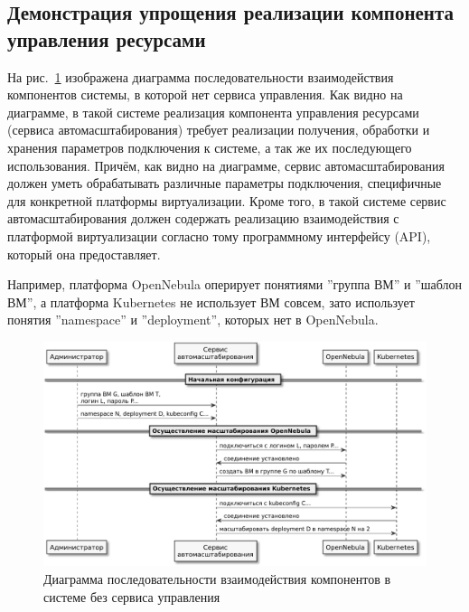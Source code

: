 \subsection[Демонстрация упрощения реализации компонента управления ресурсами]{Демонстрация упрощения реализации компонента \\ управления ресурсами}

На рис.~\ref{result-before} изображена диаграмма последовательности взаимодействия компонентов системы, в которой нет сервиса управления.
Как видно на диаграмме, в такой системе реализация компонента управления ресурсами (сервиса автомасштабирования) требует реализации получения, обработки и хранения параметров подключения к системе, а так же их последующего использования.
Причём, как видно на диаграмме, сервис автомасштабирования должен уметь обрабатывать различные параметры подключения, специфичные для конкретной платформы виртуализации.
Кроме того, в такой системе сервис автомасштабирования должен содержать реализацию взаимодействия с платформой виртуализации согласно тому программному интерфейсу (API), который она предоставляет.

Например, платформа OpenNebula оперирует понятиями ''группа ВМ'' и ''шаблон ВМ'', а платформа Kubernetes не использует ВМ совсем, зато использует понятия ''namespace'' и ''deployment'', которых нет в OpenNebula.

\begin{figure}[H]
    \centering
    \includegraphics[width=\textwidth]{img/result-before.pdf}
    \caption{Диаграмма последовательности взаимодействия компонентов в системе без сервиса управления}
    \label{result-before}
\end{figure}

